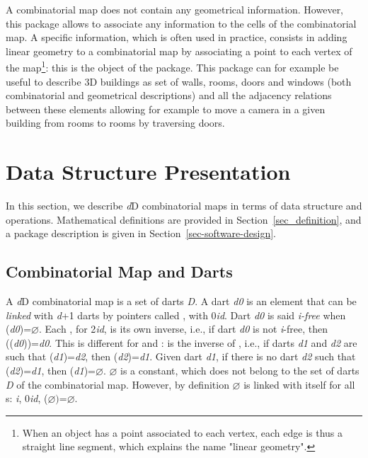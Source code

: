 A combinatorial map does not contain any geometrical
information. However, this package allows to associate any information
to the cells of the combinatorial map. A specific information, which
is often used in practice, consists in adding linear geometry to a
combinatorial map by associating a point to each vertex of the
map\footnote{When an object has a point associated to each vertex,
  each edge is thus a straight line segment, which explains the name
  "linear geometry".}: this is the object of the
 package. This package can for example be
useful to describe 3D buildings as set of walls, rooms, doors and
windows (both combinatorial and geometrical descriptions) and all the
adjacency relations between these elements allowing for example to
move a camera in a given building from rooms to rooms by traversing
doors.

\section{Data Structure Presentation}\label{sec_presentation}
In this section, we describe \emph{d}D combinatorial maps in terms of data
structure and operations. Mathematical definitions are provided in
Section~\ref{sec_definition}, and a package description is given in
Section~\ref{sec-software-design}.

\subsection{Combinatorial Map and Darts}\label{ssec-combi-map-and-darts}
A \emph{d}D combinatorial map is a set of darts \emph{D}. A dart \emph{d0} is an
element that can be \emph{linked} with \emph{d}+1 darts by pointers called
\betai{}, with 0\myleq{}\emph{i}\myleq{}\emph{d}.  Dart \emph{d0} is said \emph{i-free}
when \betai{}(\emph{d0})=$\varnothing$.  Each \betai{}, for 2\myleq{}\emph{i}\myleq{}\emph{d},
is its own inverse, i.e., if dart \emph{d0} is not \emph{i}-free, then
\betai{}(\betai{}(\emph{d0}))=\emph{d0}.  This is different for \betazero{} and
\betaun{}: \betazero{} is the inverse of \betaun{}, i.e., if darts \emph{d1}
and \emph{d2} are such that \betaun{}(\emph{d1})=\emph{d2}, then
\betazero{}(\emph{d2})=\emph{d1}. Given dart \emph{d1}, if there is no dart \emph{d2} such
that \betaun{}(\emph{d2})=\emph{d1}, then \betazero{}(\emph{d1})=$\varnothing$.  $\varnothing$
is a constant, which does not belong to the set of darts \emph{D} of the
combinatorial map. However, by definition $\varnothing$ is linked with
itself for all \betai{}s: \myforall{}\emph{i}, 0\myleq{}\emph{i}\myleq{}\emph{d},
\betai{}($\varnothing)$=$\varnothing$.

